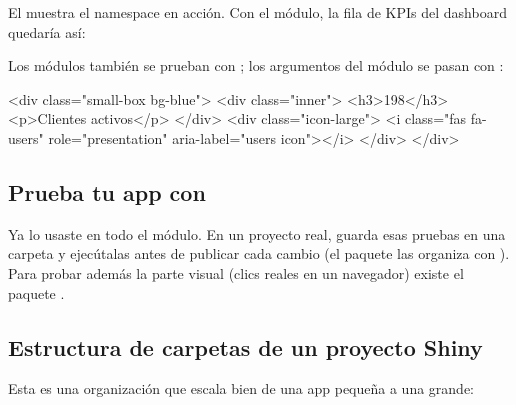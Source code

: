 El  muestra el namespace en acción. Con el módulo,
la fila de KPIs del dashboard quedaría así:


Los módulos también se prueban con ; los argumentos
del módulo se pasan con :

\begin{rsalida}
<div class="small-box bg-blue">
  <div class="inner">
    <h3>198</h3>
    <p>Clientes activos</p>
  </div>
  <div class="icon-large">
    <i class="fas fa-users" role="presentation" aria-label="users icon"></i>
  </div>
</div>
\end{rsalida}

\subsection{Prueba tu app con \texorpdfstring{}{testServer()}}

Ya lo usaste en todo el módulo. En un proyecto real, guarda esas pruebas en
una carpeta  y ejecútalas antes de publicar cada cambio (el
paquete  las organiza con ). Para
probar además la parte visual (clics reales en un navegador) existe el
paquete .

\subsection{Estructura de carpetas de un proyecto Shiny}

Esta es una organización que escala bien de una app pequeña a una grande:

